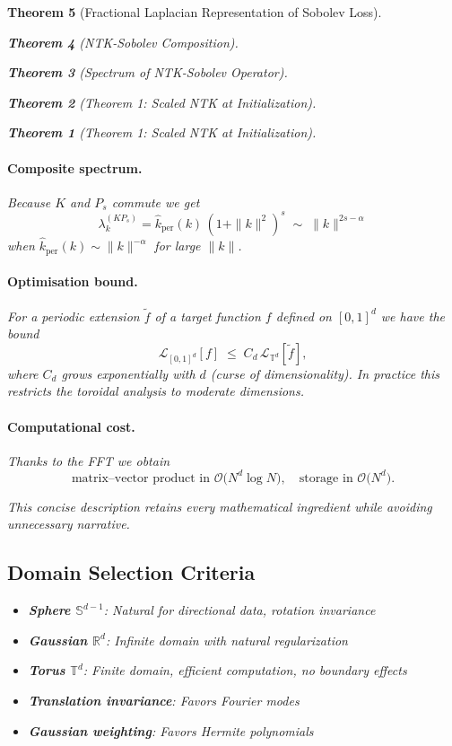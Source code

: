\documentclass{article}
\newtheorem{theorem}{Theorem}[section]
\begin{document}
\begin{theorem}[Fractional Laplacian Representation of Sobolev Loss]
\begin{theorem}[NTK-Sobolev Composition]
\begin{theorem}[Spectrum of NTK-Sobolev Operator]
\begin{theorem}[Theorem 1: Scaled NTK at Initialization]
\begin{theorem}[Theorem 1: Scaled NTK at Initialization]
\paragraph{Composite spectrum.}  Because $K$ and $P_s$ commute we get
\[
   \lambda_k^{(KP_s)} = \widehat{k}_{\text{per}}(k)\,(1+\|k\|^2)^{s}
   \;\sim\; \|k\|^{2s-\alpha}
\]
when $\widehat{k}_{\text{per}}(k)\sim\|k\|^{-\alpha}$ for large $\|k\|$.

\paragraph{Optimisation bound.}  For a periodic extension $\tilde f$ of a target function $f$ defined on $[0,1]^d$ we have the bound
\[
   \mathcal L_{[0,1]^d}[f]\;\le\; C_d\,\mathcal L_{\mathbb T^d}[\tilde f],
\]
where $C_d$ grows exponentially with $d$ (curse of dimensionality).  In practice this restricts the toroidal analysis to moderate dimensions.

\paragraph{Computational cost.}  Thanks to the FFT we obtain
\[
   \text{matrix–vector product in }\mathcal O\bigl(N^d\log N\bigr), \quad
   \text{storage in }\mathcal O\bigl(N^d\bigr).
\]

This concise description retains every mathematical ingredient while avoiding unnecessary narrative.

\subsection{Domain Selection Criteria}

\begin{itemize}
\item \textbf{Sphere $\mathbb{S}^{d-1}$}: Natural for directional data, rotation invariance
\item \textbf{Gaussian $\mathbb{R}^d$}: Infinite domain with natural regularization  
\item \textbf{Torus $\mathbb{T}^d$}: Finite domain, efficient computation, no boundary effects
\end{itemize}

\newpage

\begin{itemize}
\item \textbf{Translation invariance}: Favors Fourier modes
\item \textbf{Gaussian weighting}: Favors Hermite polynomials
\end{itemize}


\end{theorem}
\end{theorem}
\end{theorem}
\end{theorem}
\end{theorem}
\end{document}
